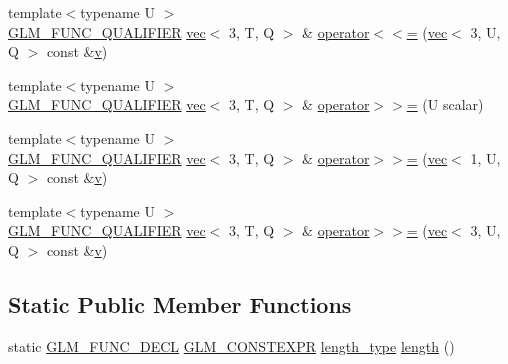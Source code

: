 \begin{DoxyCompactItemize}
{\footnotesize template$<$typename U $>$ }\\\mbox{\hyperlink{setup_8hpp_a33fdea6f91c5f834105f7415e2a64407}{G\+L\+M\+\_\+\+F\+U\+N\+C\+\_\+\+Q\+U\+A\+L\+I\+F\+I\+ER}} \mbox{\hyperlink{structglm_1_1vec}{vec}}$<$ 3, T, Q $>$ \& \mbox{\hyperlink{structglm_1_1vec_3_013_00_01_t_00_01_q_01_4_a0e01e643e55134493df457aa0b17308e}{operator$<$$<$=}} (\mbox{\hyperlink{structglm_1_1vec}{vec}}$<$ 3, U, Q $>$ const \&\mbox{\hyperlink{_s_d_l__opengl_8h_a10a82eabcb59d2fcd74acee063775f90}{v}})
\item 
{\footnotesize template$<$typename U $>$ }\\\mbox{\hyperlink{setup_8hpp_a33fdea6f91c5f834105f7415e2a64407}{G\+L\+M\+\_\+\+F\+U\+N\+C\+\_\+\+Q\+U\+A\+L\+I\+F\+I\+ER}} \mbox{\hyperlink{structglm_1_1vec}{vec}}$<$ 3, T, Q $>$ \& \mbox{\hyperlink{structglm_1_1vec_3_013_00_01_t_00_01_q_01_4_a63341fff7a58c15da93cf79016cdeefa}{operator$>$$>$=}} (U scalar)
\item 
{\footnotesize template$<$typename U $>$ }\\\mbox{\hyperlink{setup_8hpp_a33fdea6f91c5f834105f7415e2a64407}{G\+L\+M\+\_\+\+F\+U\+N\+C\+\_\+\+Q\+U\+A\+L\+I\+F\+I\+ER}} \mbox{\hyperlink{structglm_1_1vec}{vec}}$<$ 3, T, Q $>$ \& \mbox{\hyperlink{structglm_1_1vec_3_013_00_01_t_00_01_q_01_4_afa71288540c821e11e3f316c16ed1274}{operator$>$$>$=}} (\mbox{\hyperlink{structglm_1_1vec}{vec}}$<$ 1, U, Q $>$ const \&\mbox{\hyperlink{_s_d_l__opengl_8h_a10a82eabcb59d2fcd74acee063775f90}{v}})
\item 
{\footnotesize template$<$typename U $>$ }\\\mbox{\hyperlink{setup_8hpp_a33fdea6f91c5f834105f7415e2a64407}{G\+L\+M\+\_\+\+F\+U\+N\+C\+\_\+\+Q\+U\+A\+L\+I\+F\+I\+ER}} \mbox{\hyperlink{structglm_1_1vec}{vec}}$<$ 3, T, Q $>$ \& \mbox{\hyperlink{structglm_1_1vec_3_013_00_01_t_00_01_q_01_4_a62459f7f3447a3022b4079f62a719824}{operator$>$$>$=}} (\mbox{\hyperlink{structglm_1_1vec}{vec}}$<$ 3, U, Q $>$ const \&\mbox{\hyperlink{_s_d_l__opengl_8h_a10a82eabcb59d2fcd74acee063775f90}{v}})
\end{DoxyCompactItemize}
\subsection*{Static Public Member Functions}
\begin{DoxyCompactItemize}
\item 
static \mbox{\hyperlink{setup_8hpp_ab2d052de21a70539923e9bcbf6e83a51}{G\+L\+M\+\_\+\+F\+U\+N\+C\+\_\+\+D\+E\+CL}} \mbox{\hyperlink{setup_8hpp_a08b807947b47031d3a511f03f89645ad}{G\+L\+M\+\_\+\+C\+O\+N\+S\+T\+E\+X\+PR}} \mbox{\hyperlink{structglm_1_1vec_3_013_00_01_t_00_01_q_01_4_ab586a87f82719bfdd180336a98843257}{length\+\_\+type}} \mbox{\hyperlink{structglm_1_1vec_3_013_00_01_t_00_01_q_01_4_a0dc7ddc517098d4c8257187df6be4cef}{length}} ()
\end{DoxyCompactItemize}
